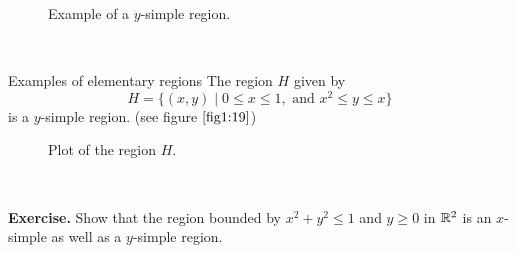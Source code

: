 \documentclass[../Analysis-3.tex]{subfiles}
\begin{document}
\begin{figure}[H]
  \centering
  \caption{Example of a $y$-simple region.}
\end{figure}

\

\begin{Eg}{Examples of elementary regions}{}
  The region $H$ given by
  \[
    H = \{ (x,y) \mid 0 \leq x \leq 1, \mbox{ and } x^2 \leq y \leq x \}
  \]
  is a $y$-simple region. (see figure $\ref{fig1:19}$)
  \begin{figure}[H]
    \centering
    \caption{Plot of the region $H$.}
    \label{fig1:19}
  \end{figure}
\end{Eg}
\

\textbf{Exercise.} Show that the region bounded by $x^2 + y^2 \leq 1$ and $y \geq 0$ in $\mathbb{R}^2$ is an $x$-simple as well as a $y$-simple region.
\end{document}
